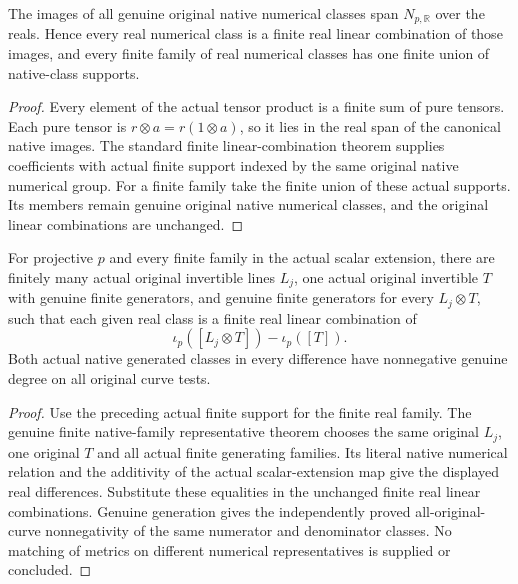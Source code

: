 \begin{theorem}
\label{thm:seven-native-real-finite-support}
\leanok
{}
The images of all genuine original native numerical classes span
$N_{p,\mathbb R}$ over the reals. Hence every real numerical class is a
finite real linear combination of those images, and every finite family
of real numerical classes has one finite union of native-class supports.
\end{theorem}
\begin{proof}
Every element of the actual tensor product is a finite sum of pure
tensors. Each pure tensor is $r\otimes a=r(1\otimes a)$, so it lies in
the real span of the canonical native images. The standard finite
linear-combination theorem supplies coefficients with actual finite
support indexed by the same original native numerical group. For a
finite family take the finite union of these actual supports. Its
members remain genuine original native numerical classes, and the
original linear combinations are unchanged.
\end{proof}

\begin{theorem}
\label{thm:seven-native-real-common-generated}
\leanok
{}
For projective $p$ and every finite family in the actual scalar extension,
there are finitely many actual original invertible lines $L_j$, one
actual original invertible $T$ with genuine finite generators, and
genuine finite generators for every $L_j\otimes T$, such that each
given real class is a finite real linear combination of
\[
 \iota_p([L_j\otimes T])-\iota_p([T]).
\]
Both actual native generated classes in every difference have
nonnegative genuine degree on all original curve tests.
\end{theorem}
\begin{proof}
Use the preceding actual finite support for the finite real family.
The genuine finite native-family representative theorem chooses the
same original $L_j$, one original $T$ and all actual finite generating
families. Its literal native numerical relation and the additivity of
the actual scalar-extension map give the displayed real differences.
Substitute these equalities in the unchanged finite real linear
combinations. Genuine generation gives the independently proved
all-original-curve nonnegativity of the same numerator and denominator
classes. No matching of metrics on different numerical representatives
is supplied or concluded.
\end{proof}
